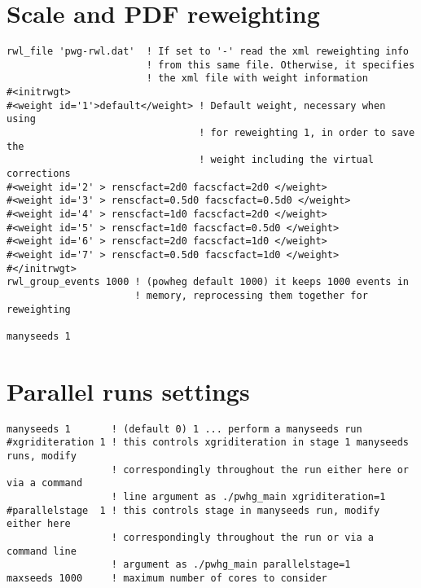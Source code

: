 \section{Scale and PDF reweighting}
\begin{lstlisting}[basicstyle=\ttfamily\scriptsize,frame = single]
rwl_file 'pwg-rwl.dat'  ! If set to '-' read the xml reweighting info 
                        ! from this same file. Otherwise, it specifies 
                        ! the xml file with weight information
#<initrwgt>
#<weight id='1'>default</weight> ! Default weight, necessary when using
                                 ! for reweighting 1, in order to save the
                                 ! weight including the virtual corrections
#<weight id='2' > renscfact=2d0 facscfact=2d0 </weight>
#<weight id='3' > renscfact=0.5d0 facscfact=0.5d0 </weight>
#<weight id='4' > renscfact=1d0 facscfact=2d0 </weight>    
#<weight id='5' > renscfact=1d0 facscfact=0.5d0 </weight>  
#<weight id='6' > renscfact=2d0 facscfact=1d0 </weight>    
#<weight id='7' > renscfact=0.5d0 facscfact=1d0 </weight>  
#</initrwgt>
rwl_group_events 1000 ! (powheg default 1000) it keeps 1000 events in 
                      ! memory, reprocessing them together for reweighting

manyseeds 1
\end{lstlisting}
\newpage
\section{Parallel runs settings}
\begin{lstlisting}[basicstyle=\ttfamily\scriptsize,frame = single]
manyseeds 1       ! (default 0) 1 ... perform a manyseeds run
#xgriditeration 1 ! this controls xgriditeration in stage 1 manyseeds runs, modify
                  ! correspondingly throughout the run either here or via a command
                  ! line argument as ./pwhg_main xgriditeration=1 
#parallelstage  1 ! this controls stage in manyseeds run, modify either here
                  ! correspondingly throughout the run or via a command line
                  ! argument as ./pwhg_main parallelstage=1 
maxseeds 1000     ! maximum number of cores to consider

\end{lstlisting}
